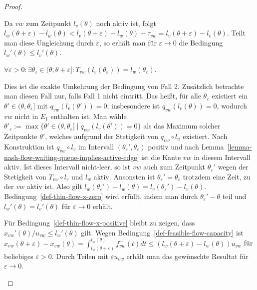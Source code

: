 \begin{proof}
\begin{description}[leftmargin=0cm, topsep=0cm, itemindent=0.5cm]
		Da $vw$ zum Zeitpunkt $l_v(\theta)$ noch aktiv ist, folgt $l_w(\theta + \varepsilon) - l_w(\theta) < l_v(\theta+\varepsilon) - l_w(\theta) + \tau_{vw} = l_v(\theta + \varepsilon) - l_v(\theta)$.
		Teilt man diese Ungleichung  durch $\varepsilon$, so erhält man für $\varepsilon\rightarrow 0$ die Bedingung $l_w'(\theta)\leq l_v'(\theta)$.
		
		\item[3. Fall:] $\forall \varepsilon>0: \exists \theta_{\varepsilon}\in (\theta, \theta+\varepsilon]: T_{vw}(l_v(\theta_\varepsilon)) = l_w(\theta_\varepsilon)$.
		
		Dies ist die exakte Umkehrung der Bedingung von Fall 2.
		Zusätzlich betrachte man diesen Fall nur, falls Fall 1 nicht eintritt.
		Das heißt, für alle $\theta_\varepsilon$ existiert ein $\theta'\in(\theta, \theta_\varepsilon]$ mit $q_{vw}(l_v(\theta')) = 0$; insbesondere ist $q_{vw}(l_v(\theta))= 0$, wodurch $vw$ nicht in $E_1$ enthalten ist.
		Man wähle $\theta'_\varepsilon:=\max\{ \theta'\in (\theta, \theta_\varepsilon] \mid q_{vw}(l_v(\theta')) = 0 \}$ als das Maximum solcher Zeitpunkte $\theta'$, welches aufgrund der Stetigkeit von $q_{vw}\circ l_u$ existiert.
		Nach Konstruktion ist $q_{vw}\circ l_v$ im Intervall $(\theta_\varepsilon', \theta_\varepsilon)$ positiv und nach Lemma~\ref{lemma-nash-flow-waiting-queue-implies-active-edge} ist die Kante $vw$ in diesem Intervall aktiv.
		Ist dieses Intervall nicht-leer, so ist $vw$ auch zum Zeitpunkt $\theta_\varepsilon'$ wegen der Stetigkeit von $T_{vw}\circ l_v$ und $l_w$ aktiv.
		Ansonsten ist $\theta_\varepsilon'=\theta_\varepsilon$ trotzdem eine Zeit, zu der $vw$ aktiv ist.
		Also gilt $l_w(\theta_\varepsilon') - l_w(\theta) = l_v(\theta_\varepsilon') - l_v(\theta)$.
		Bedingung~\ref{def-thin-flow-x-zero} wird erfüllt, indem man durch $\theta_\varepsilon'-\theta$ teil und $l_w'(\theta) = l_v'(\theta)$ für $\varepsilon\rightarrow0$ erhält.
		
		Für Bedingung~\ref{def-thin-flow-x-positive} bleibt zu zeigen, dass $x_{vw}'(\theta) /u_{vw}\leq l_w'(\theta)$ gilt.
		Wegen Bedingung~\ref{def-feasible-flow-capacity} ist $x_{vw}(\theta + \varepsilon)-x_{vw}(\theta) = \int_{l_w(\theta+\varepsilon)}^{l_w(\theta)} f_{vw}^-(t) dt\leq (l_w(\theta + \varepsilon) - l_w(\theta)) u_{vw}$ für beliebiges $\varepsilon>0$.
		Durch Teilen mit $\varepsilon u_{vw}$ erhält man das gewünschte Resultat für $\varepsilon\rightarrow 0$.
	\end{description}
\vspace{-1.2 \baselineskip}
\end{proof}

